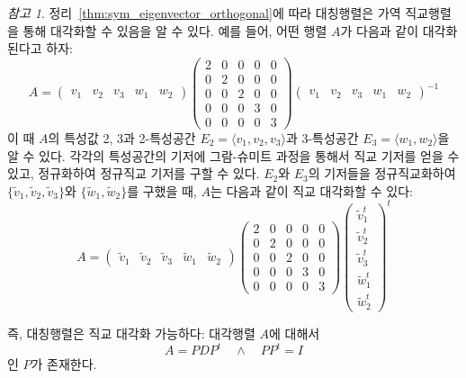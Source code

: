 \documentclass[unfonts,oneside,a4paper]{oblivoir}
\theoremstyle{definition}
\theoremstyle{theorem}
\theoremstyle{theorem}
\theoremstyle{remark}
\newtheorem*{remark}{참고}
\theoremstyle{remark}
\theoremstyle{remark}
\theoremstyle{remark}
\renewcommand{\vec}[1]{\bm{\mathit{#1}}}
\begin{document}
\begin{remark}
    정리~\ref{thm:sym_eigenvector_orthogonal}에 따라 대칭행렬은 가역 직교행렬을 통해 대각화할 수 있음을 알 수 있다.
    예를 들어, 어떤 행렬 $A$가 다음과 같이 대각화된다고 하자:
    \begin{equation*}
        A =
        \begin{pmatrix}
            \vec v_1 & \vec v_2 & \vec v_3 & \vec w_1 & \vec w_2
        \end{pmatrix}
        \begin{pmatrix}
            2 & 0 & 0 & 0 & 0\\
            0 & 2 & 0 & 0 & 0\\
            0 & 0 & 2 & 0 & 0\\
            0 & 0 & 0 & 3 & 0\\
            0 & 0 & 0 & 0 & 3
        \end{pmatrix}
        \begin{pmatrix}
            \vec v_1 & \vec v_2 & \vec v_3 & \vec w_1 & \vec w_2
        \end{pmatrix}^{-1}
    \end{equation*}
    이 때 $A$의 특성값 2, 3과 2-특성공간 $E_2 = \langle \vec v_1, \vec v_2, \vec v_3 \rangle$과 3-특성공간 $E_3 = \langle \vec w_1, \vec w_2\rangle$을 알 수 있다.
    각각의 특성공간의 기저에 그람-슈미트 과정을 통해서 직교 기저를 얻을 수 있고, 정규화하여 정규직교 기저를 구할 수 있다.
    $E_2$와 $E_3$의 기저들을 정규직교화하여 $\{\tilde{\vec v}_1, \tilde{\vec v}_2, \tilde{\vec v}_3\}$와 $\{\tilde{\vec w}_1, \tilde{\vec w}_2\}$를 구했을 때, $A$는 다음과 같이 직교 대각화할 수 있다:
    \begin{equation*}
        A =
        \begin{pmatrix}
            \tilde{\vec{v}}_1 & \tilde{\vec{v}}_2 & \tilde{\vec{v}}_3 & \tilde{\vec{w}}_1 & \tilde{\vec{w}}_2
        \end{pmatrix}
        \begin{pmatrix}
            2 & 0 & 0 & 0 & 0\\
            0 & 2 & 0 & 0 & 0\\
            0 & 0 & 2 & 0 & 0\\
            0 & 0 & 0 & 3 & 0\\
            0 & 0 & 0 & 0 & 3
        \end{pmatrix}
        \begin{pmatrix}
            \tilde{\vec{v}}_1^t \\ \tilde{\vec{v}}_2^t \\ \tilde{\vec{v}}_3^t \\ \tilde{\vec{w}}_1^t \\ \tilde{\vec{w}}_2^t
        \end{pmatrix}^t
    \end{equation*}
    
    즉, 대칭행렬은 직교 대각화 가능하다:
    대각행렬 $A$에 대해서
    \begin{equation*}
        A = PDP^t \quad \wedge \quad PP^t = I
    \end{equation*}
    인 $P$가 존재한다.
\end{remark}
\end{document}
